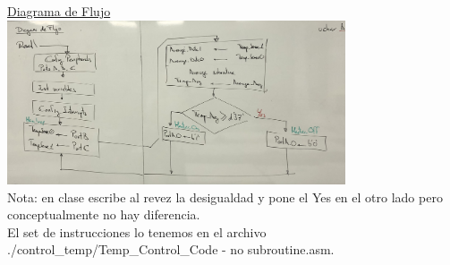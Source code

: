 \documentclass{report}
\begin{document}
\underline{Diagrama de Flujo} \\
\includegraphics[width=10cm]{../Assets/Temp_Control_Diagrama_Flujo.jpg}\\
Nota: en clase escribe al revez la desigualdad y pone el Yes en el otro lado pero conceptualmente no hay diferencia. \\

El set de instrucciones lo tenemos en el archivo \\./control\_temp/Temp\_Control\_Code - no subroutine.asm.
\end{document}
